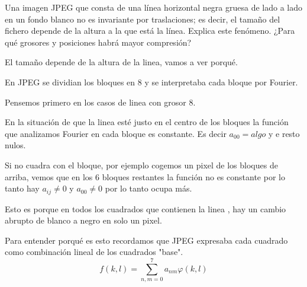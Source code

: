 \begin{problem}[8]
Una imagen JPEG que consta de una línea horizontal negra gruesa de lado a lado
en un fondo blanco no es invariante por traslaciones; es decir, el tamaño del fichero depende de la altura a la que está la línea. Explica este fenómeno. ¿Para qué grosores y posiciones habrá mayor compresión?

\solution

El tamaño depende de la altura de la linea, vamos a ver porqué.

En JPEG se dividian los bloques en 8 y se interpretaba cada bloque por Fourier.

Pensemos primero en los casos de linea con grosor 8.

En la situación de que la linea esté justo en el centro de los bloques la función que analizamos Fourier en cada bloque es constante. Es decir $a_{00} = algo$ y e resto nulos.

Si no cuadra con el bloque, por ejemplo cogemos un pixel de los bloques de arriba, vemos que en los 6 bloques restantes la función no es constante por lo tanto hay $a_{ij} \neq 0$ y $a_{00}\neq 0$ por lo tanto ocupa más.

Esto es porque en todos los cuadrados que contienen la linea , hay un cambio abrupto de blanco a negro en solo un pixel.

Para entender porqué es esto recordamos que JPEG expresaba cada cuadrado como combinación lineal de los cuadrados "base".
$$f(k,l) = \sum_{n,m = 0}^{7} a_{nm} \varphi(k,l)$$






\end{problem}

